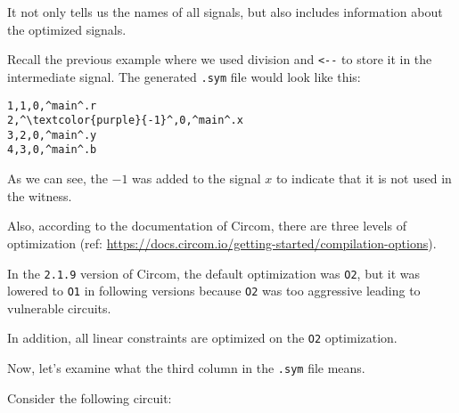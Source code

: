 \documentclass[../lecture-notes.tex]{subfiles}
\begin{document}
    It not only tells us the names of all signals, but also includes information about the optimized signals.

    Recall the previous example where we used division and \texttt{<-{-}} to store it in the intermediate signal.
    The generated \texttt{.sym} file would look like this:

    \begin{center}
        \begin{tcolorbox}[enhanced,
            width=0.5\textwidth,
            title=\textbf{.sym file for $b \;\texttt{<-{-}}\; x/y, r \;\texttt{<==}\; by$},
            coltitle=gray!25!black,
            attach boxed title to top center={yshift=-2mm,yshifttext=-1mm},
            boxed title style={size=small,colframe=gray!75!black,
            colback=blue!30!white,boxrule=1pt},
            top=-0.35cm,
            bottom=-0.35cm]
            \begin{lstlisting}[language=Circom,numbers=none,basicstyle=\ttfamily\footnotesize,escapechar=^]
1,1,0,^main^.r
2,^\textcolor{purple}{-1}^,0,^main^.x
3,2,0,^main^.y
4,3,0,^main^.b
            \end{lstlisting}
        \end{tcolorbox}
    \end{center}

    As we can see, the $-1$ was added to the signal $x$ to indicate that it is not used in the witness.

    Also, according to the documentation of Circom, there are three levels of optimization (ref: \url{https://docs.circom.io/getting-started/compilation-options}).

    In the \texttt{2.1.9} version of Circom, the default optimization was \texttt{O2}, but it was lowered to \texttt{O1} in following versions because \texttt{O2} was too aggressive leading to vulnerable circuits.

    \begin{remark}
        In addition, all linear constraints are optimized on the \texttt{O2} optimization.
    \end{remark}

    Now, let's examine what the third column in the \texttt{.sym} file means.

    Consider the following circuit:
\end{document}

